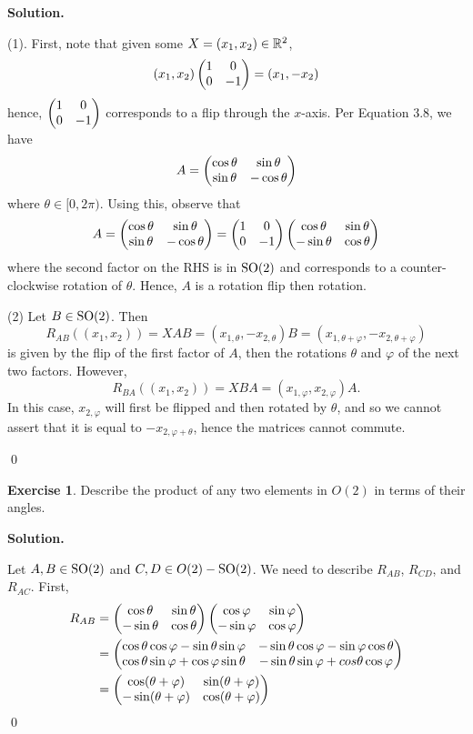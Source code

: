 \documentclass[12pt]{book}
\theoremstyle{definition}
\newtheorem{exercise}{Exercise}[chapter]
\newenvironment{solution}
{%
  \par\noindent\textbf{Solution.}\quad
}
{%
  \qed\par
}
\begin{document}
\begin{solution}
  (1). First, note that given some $X = (x_1, x_2) \in \mathbb{R}^2$,
  \[
    (x_1, x_2)\begin{pmatrix} 1 & 0 \\ 0 & -1 \end{pmatrix} = (x_1, -x_2)
  \]
  hence, $\begin{pmatrix} 1 & 0 \\ 0 & -1 \end{pmatrix}$ corresponds to a flip through the $x$-axis.
  Per Equation 3.8, we have
  \[
  A = \begin{pmatrix} \cos\theta & \sin\theta \\ \sin\theta & -\cos\theta \end{pmatrix}
  \]
  where $\theta \in [0, 2\pi)$.
  Using this, observe that
  \[
    A = \begin{pmatrix} \cos\theta & \sin\theta \\ \sin\theta & -\cos\theta \end{pmatrix} = \begin{pmatrix} 1 & 0 \\ 0 & -1 \end{pmatrix} \begin{pmatrix} \cos \theta & \sin \theta \\ -\sin\theta & \cos\theta \end{pmatrix}
  \]
  where the second factor on the RHS is in $\mathrm{SO}(2)$ and corresponds to a counter-clockwise rotation of $\theta$.
  Hence, $A$ is a rotation flip then rotation.

  (2) Let $B \in \mathrm{SO}(2)$. Then 
  \[
  R_{AB}((x_1, x_2)) = XAB = (x_{1, \theta}, -x_{2, \theta})B = (x_{1, \theta + \varphi}, -x_{2, \theta + \varphi})
  \]
  is given by the flip of the first factor of $A$, then the rotations $\theta$ and $\varphi$ of the next two factors.
  However,
  \[
  R_{BA}((x_1, x_2)) = XBA = (x_{1, \varphi}, x_{2, \varphi})A.
  \]
  In this case, $x_{2, \varphi}$ will first be flipped and then rotated by $\theta$, and so we cannot assert that it is equal to $-x_{2, \varphi + \theta}$, hence the matrices cannot commute.

\end{solution}

\begin{exercise}
  Describe the product of any two elements in $O(2)$ in terms of their angles.
\end{exercise}

\begin{solution}
  Let $A, B \in \mathrm{SO}(2)$ and $C, D \in O(2) - \mathrm{SO}(2)$.
  We need to describe $R_{AB}$, $R_{CD}$, and $R_{AC}$.
  First, 
  \[
  \begin{aligned}
    R_{AB} &= \begin{pmatrix} \cos \theta & \sin \theta \\ -\sin\theta & \cos\theta \end{pmatrix} \begin{pmatrix} \cos \varphi & \sin \varphi \\ -\sin\varphi & \cos\varphi \end{pmatrix} \\
           &= \begin{pmatrix} \cos\theta\cos\varphi - \sin\theta\sin\varphi & -\sin\theta\cos\varphi - \sin\varphi\cos\theta \\ \cos\theta\sin\varphi + \cos\varphi\sin\theta & -\sin\theta\sin\varphi + cos\theta\cos\varphi \end{pmatrix} \\
           &= \begin{pmatrix} \cos(\theta + \varphi) & \sin(\theta + \varphi) \\ -\sin(\theta + \varphi) & \cos(\theta + \varphi) \end{pmatrix}
  \end{aligned}
  \]
\end{solution}
\end{document}
